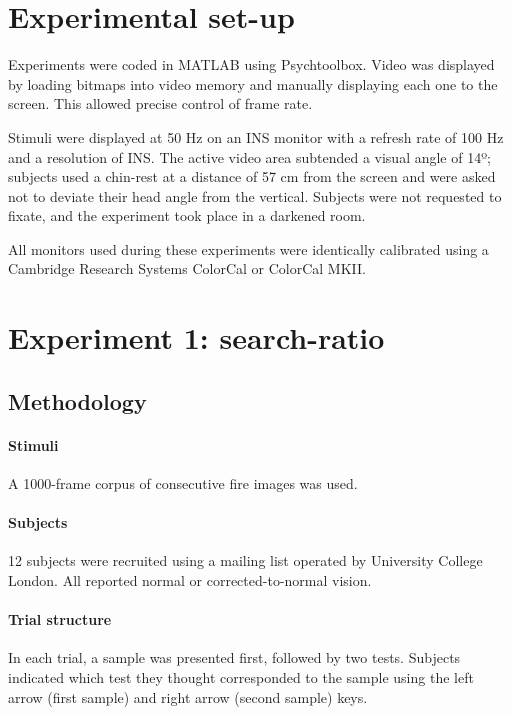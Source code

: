 \section{Experimental set-up}

Experiments were coded in MATLAB using Psychtoolbox. Video was displayed by loading bitmaps into video memory and manually displaying each one to the screen. This allowed precise control of frame rate.

Stimuli were displayed at 50 Hz on an INS monitor with a refresh rate of 100 Hz and a resolution of INS. The active video area subtended a visual angle of 14º; subjects used a chin-rest at a distance of 57 cm from the screen and were asked not to deviate their head angle from the vertical. Subjects were not requested to fixate, and the experiment took place in a darkened room.

All monitors used during these experiments were identically calibrated using a Cambridge Research Systems ColorCal or ColorCal MKII.


\section{Experiment 1: \textbf{search-ratio}}

\subsection{Methodology}

\paragraph{Stimuli}

A 1000-frame corpus of consecutive fire images was used.

\paragraph{Subjects}

12 subjects were recruited using a mailing list operated by University College London. All reported normal or corrected-to-normal vision.

\paragraph{Trial structure}

In each trial, a sample was presented first, followed by two tests. Subjects indicated which test they thought corresponded to the sample using the left arrow (first sample) and right arrow (second sample) keys. 

